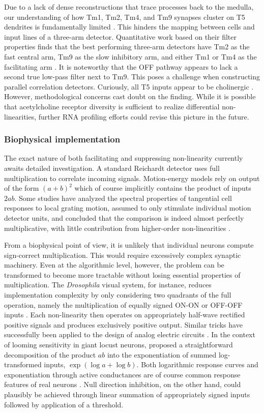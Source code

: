 Due to a lack of dense reconstructions that trace processes back to the medulla, our understanding of how Tm1, Tm2, Tm4, and Tm9 synapses cluster on T5 dendrites is fundamentally limited \citep{Shinomiya:2014dx}. This hinders the mapping between cells and input lines of a three-arm detector. Quantitative work based on their filter properties finds that the best performing three-arm detectors have Tm2 as the fast central arm, Tm9 as the slow inhibitory arm, and either Tm1 or Tm4 as the facilitating arm \citep{Arenz:2017aa}. It is noteworthy that the OFF pathway appears to lack a second true low-pass filter next to Tm9. This poses a challenge when constructing parallel correlation detectors. Curiously, all T5 inputs appear to be cholinergic \citep{Shinomiya:2014dx}. However, methodological concerns cast doubt on the finding. While it is possible that acetylcholine receptor diversity is sufficient to realize differential non-linearities, further RNA profiling efforts could revise this picture in the future.

\subsubsection{Biophysical implementation}
The exact nature of both facilitating and suppressing non-linearity currently awaits detailed investigation. A standard Reichardt detector uses full multiplication to correlate incoming signals. Motion-energy models rely on output of the form $(a+b)^2$ which of course implicitly contains the product of inputs $2ab$. Some studies have analyzed the spectral properties of tangential cell responses to local grating motion, assumed to only stimulate individual motion detector units, and concluded that the comparison is indeed almost perfectly multiplicative, with little contribution from higher-order non-linearities \citep{Egelhaaf:1989wf}.

From a biophysical point of view, it is unlikely that individual neurons compute sign-correct multiplication. This would require excessively complex synaptic machinery. Even at the algorithmic level, however, the problem can be transformed to become more tractable without losing essential properties of multiplication. The \textit{Drosophila} visual system, for instance, reduces implementation complexity by only considering two quadrants of the full operation, namely the multiplication of equally signed ON-ON or OFF-OFF inputs \citep{Eichner:2011ic}. Each non-linearity then operates on appropriately half-wave rectified positive signals and produces exclusively positive output. Similar tricks have successfully been applied to the design of analog electric circuits \citep{Mead:1989aa}. In the context of looming sensitivity in giant locust neurons, \citet{Gabbiani:2002kb} proposed a straightforward decomposition of the product $ab$ into the exponentiation of summed log-transformed inputs, $\exp(\log a + \log b)$. Both logarithmic response curves and exponentiation through active conductances are of course common response features of real neurons \citep{Koch:2004aa}. Null direction inhibition, on the other hand, could plausibly be achieved through linear summation of appropriately signed inputs followed by application of a threshold.

